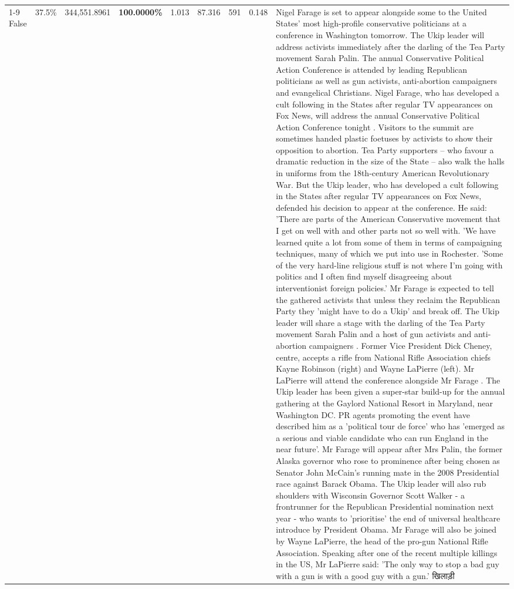 \begin{table}[H]
\begin{tabular}{lllrlllll}
\cline{1-9} \cline{2-9}
False & 37.5\% & 344,551.8961 & \bfseries \color{red} 100.0000\% & 1.013 & 87.316 & 591 & 0.148 & Nigel Farage is set to appear alongside some to the United States' most high-profile conservative politicians at a conference in Washington tomorrow. The Ukip leader will address activists immediately after the darling of the Tea Party movement Sarah Palin. The annual Conservative Political Action Conference is attended by leading Republican politicians as well as gun activists, anti-abortion campaigners and evangelical Christians. Nigel Farage, who has developed a cult following in the States after regular TV appearances on Fox News, will address the annual Conservative Political Action Conference tonight . Visitors to the summit are sometimes handed plastic foetuses by activists to show their opposition to abortion. Tea Party supporters – who favour a dramatic reduction in the size of the State – also walk the halls in uniforms from the 18th-century American Revolutionary War. But the Ukip leader, who has developed a cult following in the States after regular TV appearances on Fox News, defended his decision to appear at the conference. He said: 'There are parts of the American Conservative movement that I get on well with and other parts not so well with. 'We have learned quite a lot from some of them in terms of campaigning techniques, many of which we put into use in Rochester. 'Some of the very hard-line religious stuff is not where I'm going with politics and I often find myself disagreeing about interventionist foreign policies.' Mr Farage is expected to tell the gathered activists that unless they reclaim the Republican Party they 'might have to do a Ukip' and break off. The Ukip leader will share a stage with the darling of the Tea Party movement Sarah Palin and a host of gun activists and anti-abortion campaigners . Former Vice President Dick Cheney, centre, accepts a rifle from National Rifle Association chiefs Kayne Robinson (right) and Wayne LaPierre (left). Mr LaPierre will attend the conference alongside Mr Farage . The Ukip leader has been given a super-star build-up for the annual gathering at the Gaylord National Resort in Maryland, near Washington DC. PR agents promoting the event have described him as a 'political tour de force' who has 'emerged as a serious and viable candidate who can run England in the near future'. Mr Farage will appear after Mrs Palin, the former Alaska governor who rose to prominence after being chosen as Senator John McCain's running mate in the 2008 Presidential race against Barack Obama. The Ukip leader will also rub shoulders with Wisconsin Governor Scott Walker - a frontrunner for the Republican Presidential nomination next year - who wants to 'prioritise' the end of universal healthcare introduce by President Obama. Mr Farage will also be joined by Wayne LaPierre, the head of the pro-gun National Rifle Association. Speaking after one of the recent multiple killings in the US, Mr LaPierre said: 'The only way to stop a bad guy with a gun is with a good guy with a gun.' खिलाड़ी \\

\end{tabular}
\end{table}
